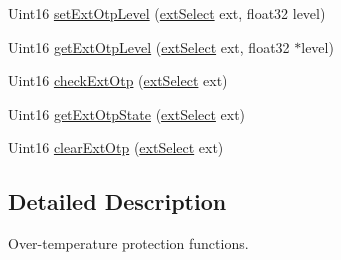 \begin{DoxyCompactItemize}
\item 
Uint16 \hyperlink{a00034_a401769d2159032dba89f9826c5c32253}{set\-Ext\-Otp\-Level} (\hyperlink{a00027_a258413561252a6c94af200747272a9f3}{ext\-Select} ext, float32 level)
\item 
Uint16 \hyperlink{a00034_a989c9cce522e15da5a37a3f6843161e1}{get\-Ext\-Otp\-Level} (\hyperlink{a00027_a258413561252a6c94af200747272a9f3}{ext\-Select} ext, float32 $\ast$level)
\item 
Uint16 \hyperlink{a00034_a3bf6ccb465aa4c60464dece3f4bb2dcc}{check\-Ext\-Otp} (\hyperlink{a00027_a258413561252a6c94af200747272a9f3}{ext\-Select} ext)
\item 
Uint16 \hyperlink{a00034_a4b40fa3df1da35063225d79c83e85a0c}{get\-Ext\-Otp\-State} (\hyperlink{a00027_a258413561252a6c94af200747272a9f3}{ext\-Select} ext)
\item 
Uint16 \hyperlink{a00034_a6444030799cca288f6ac6925a6b4171a}{clear\-Ext\-Otp} (\hyperlink{a00027_a258413561252a6c94af200747272a9f3}{ext\-Select} ext)
\end{DoxyCompactItemize}


\subsection{Detailed Description}
Over-\/temperature protection functions. 

